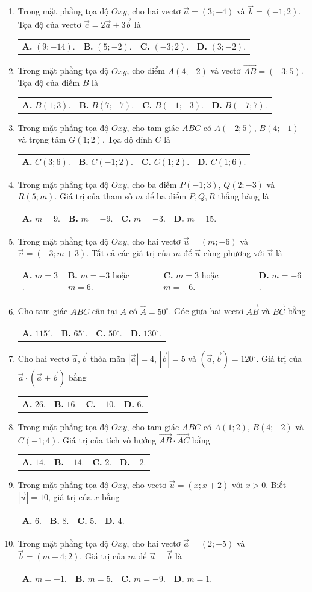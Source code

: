\documentclass[10pt,a4paper]{article}
\makeatletter
\newcommand{\four}[4]{\par\vspace{1.2pt}\noindent\begin{tabularx}{\linewidth}{@{}*{4}{>{\raggedright\arraybackslash}X}@{}}\textsf{\textbf{\color{ink}A.}} #1&\textsf{\textbf{\color{ink}B.}} #2&\textsf{\textbf{\color{ink}C.}} #3&\textsf{\textbf{\color{ink}D.}} #4\end{tabularx}}
\makeatother
\begin{document}
\begin{enumerate}
\item Trong mặt phẳng tọa độ $Oxy$, cho hai vectơ $\vec{a} = (3; -4)$ và $\vec{b} = (-1; 2)$. Tọa độ của vectơ $\vec{c} = 2\vec{a} + 3\vec{b}$ là
\four{$(9; -14)$.}{$(5; -2)$.}{$(-3; 2)$.}{$(3; -2)$.}

\item Trong mặt phẳng tọa độ $Oxy$, cho điểm $A(4; -2)$ và vectơ $\vec{AB} = (-3; 5)$. Tọa độ của điểm $B$ là
\four{$B(1; 3)$.}{$B(7; -7)$.}{$B(-1; -3)$.}{$B(-7; 7)$.}

\item Trong mặt phẳng tọa độ $Oxy$, cho tam giác $ABC$ có $A(-2; 5)$, $B(4; -1)$ và trọng tâm $G(1; 2)$. Tọa độ đỉnh $C$ là
\four{$C(3; 6)$.}{$C(-1; 2)$.}{$C(1; 2)$.}{$C(1; 6)$.}

\item Trong mặt phẳng tọa độ $Oxy$, cho ba điểm $P(-1; 3)$, $Q(2; -3)$ và $R(5; m)$. Giá trị của tham số $m$ để ba điểm $P, Q, R$ thẳng hàng là
\four{$m = 9$.}{$m = -9$.}{$m = -3$.}{$m = 15$.}
\pagebreak

\item Trong mặt phẳng tọa độ $Oxy$, cho hai vectơ $\vec{u} = (m; -6)$ và $\vec{v} = (-3; m + 3)$. Tất cả các giá trị của $m$ để $\vec{u}$ cùng phương với $\vec{v}$ là
\four{$m = 3$.}{$m = -3$ hoặc $m = 6$.}{$m = 3$ hoặc $m = -6$.}{$m = -6$.}

\item Cho tam giác $ABC$ cân tại $A$ có $\widehat{A} = 50^\circ$. Góc giữa hai vectơ $\vec{AB}$ và $\vec{BC}$ bằng
\four{$115^\circ$.}{$65^\circ$.}{$50^\circ$.}{$130^\circ$.}

\item Cho hai vectơ $\vec{a}, \vec{b}$ thỏa mãn $|\vec{a}| = 4$, $|\vec{b}| = 5$ và $(\vec{a}, \vec{b}) = 120^\circ$. Giá trị của $\vec{a} \cdot (\vec{a} + \vec{b})$ bằng
\four{$26$.}{$16$.}{$-10$.}{$6$.}

\item Trong mặt phẳng tọa độ $Oxy$, cho tam giác $ABC$ có $A(1; 2)$, $B(4; -2)$ và $C(-1; 4)$. Giá trị của tích vô hướng $\vec{AB} \cdot \vec{AC}$ bằng
\four{$14$.}{$-14$.}{$2$.}{$-2$.}

\item Trong mặt phẳng tọa độ $Oxy$, cho vectơ $\vec{u} = (x; x + 2)$ với $x > 0$. Biết $|\vec{u}| = 10$, giá trị của $x$ bằng
\four{$6$.}{$8$.}{$5$.}{$4$.}

\item Trong mặt phẳng tọa độ $Oxy$, cho hai vectơ $\vec{a} = (2; -5)$ và $\vec{b} = (m + 4; 2)$. Giá trị của $m$ để $\vec{a} \perp \vec{b}$ là
\four{$m = -1$.}{$m = 5$.}{$m = -9$.}{$m = 1$.}


\end{enumerate}
\end{document}
